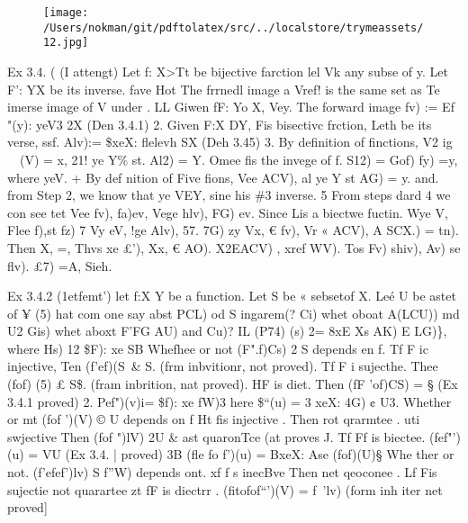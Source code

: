 \documentclass[a4paper,12pt]{article}
\begin{document}
\begin{figure}[h]

\texttt{[image: /Users/nokman/git/pdftolatex/src/../localstore/trymeassets/12.jpg]}

\centering

\end{figure}

\par

\vspace{10pt}

    Ex 3.4. ( (I attengt)   Let f: X>Tt be bijective farction lel Vk any subse of y.   Let F': YX be its inverse. fave Hot The frrnedl image a Vref!  is the same set as Te imerse image of V under .    LL Giwen fF: Yo X, Vey.  The forward image fv) := Ef "(y): yeV3 2X (Den 3.4.1)    2. Given F:X DY, Fis bisectivc frction, Leth be its verse, ssf.  Alv):= \$xeX: flelevh SX (Deh 3.45)    3. By definition of finctions, V2 ig ~~(V) = x, 21! ye Y\% st. Al2) = Y.  Omee fis the invege of f. S12) = Gof) fy) =y, where yeV.    + By def nition of Five fions, Vee ACV), al ye Y st AG) = y.  and. from Step 2, we know that ye VEY, sine his \#3 inverse.    5 From steps dard 4 we con see tet Vee fv), fa)ev,  Vege hlv), FG) ev.    Since Lis a biectwe fuctin. Wye V, Flee f),st fz) 7  Vy eV, !ge Alv), 57. 7G) zy    Vx, € fv), Vr « ACV),  A SCX.) = tn). Then X, =, Thvs xe £'), Xx, € AO).    X2EACV) , xref WV).  Tos Fv) shiv), Av) se flv). £7) =A, Sieh. 

\vspace{10pt}

\par

\vspace{10pt}

    Ex 3.4.2 (1etfemt’)   let f:X Y be a function. Let S be « sebsetof X. Leé U be astet of ¥  (5) hat com one say abst PCL) od S ingarem(?   Ci) whet oboat A(LCU)) md U2   Gis) whet aboxt F'FG AU) and Cu)?    IL (P74) (s) 2= 8xE Xs AK) E LG)\}, where Hs) 12 \$F): xe SB  Whefhee or not (F".f)Cs) 2 S depends en f.  Tf F ic injective, Ten (f'ef)(S\ \& S. (frm inbvitionr, not proved).  Tf F i sujecthe. Thee (fof) (5) £ S\$. (fram inbrition, nat proved).  HF is diet. Then (fF 'of)CS) = § (Ex 3.4.1 proved)    2. Pef")(v)i= \$f): xe fW)3 here \$“(u) = 3 xeX: 4G) ¢ U3.  Whether or mt (fof ')(V) © U depends on f  Ht fis injective . Then rot qrarmtee .  uti swjective Then (fof ")lV) 2U \& ast quaronTce (at proves J.  Tf Ff is biectee.  (fef"')(u) = VU (Ex 3.4. | proved)    3B (fle fo f')(u) = BxeX: Ase (fof)(U)§  Whe ther or not. (f'efef')lv) S f''W) depends ont.  xf f s inecBve Then net qeoconee .  Lf Fis sujectie not quarartee    zt fF is diectrr . (fitofof“')(V) = f~'lv) (form inh iter net proved] 
\end{document}
